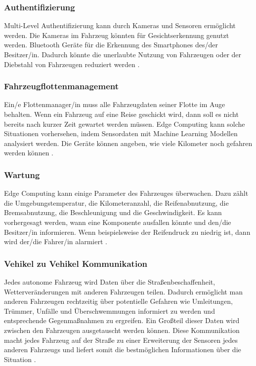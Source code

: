 \documentclass{sigchi}
\begin{document}

\subsubsection{Authentifizierung}
Multi-Level Authentifizierung kann durch Kameras und Sensoren ermöglicht werden. Die Kameras im Fahrzeug könnten für Gesichtserkennung genutzt werden. Bluetooth Geräte für die Erkennung des Smartphones des/der Besitzer/in. Dadurch könnte die unerlaubte Nutzung von Fahrzeugen oder der Diebstahl von Fahrzeugen reduziert werden \cite{role-edge-computing:2020}.

\subsubsection{Fahrzeugflottenmanagement}
Ein/e Flottenmanager/in muss alle Fahrzeugdaten seiner Flotte im Auge behalten. Wenn ein Fahrzeug auf eine Reise geschickt wird, dann soll es nicht bereits nach kurzer Zeit gewartet werden müssen. Edge Computing kann solche Situationen vorhersehen, indem Sensordaten mit Machine Learning Modellen analysiert werden. Die Geräte können angeben, wie viele Kilometer noch gefahren werden können \cite{role-edge-computing:2020}.

\subsubsection{Wartung}
Edge Computing kann einige Parameter des Fahrzeuges überwachen. Dazu zählt die Umgebungstemperatur, die Kilometeranzahl, die Reifenabnutzung, die Bremsabnutzung, die Beschleunigung und die Geschwindigkeit. Es kann vorhergesagt werden, wann eine Komponente ausfallen könnte und den/die Besitzer/in informieren. Wenn beispielsweise der Reifendruck zu niedrig ist, dann wird der/die Fahrer/in alarmiert \cite{role-edge-computing:2020}.

\subsubsection{Vehikel zu Vehikel Kommunikation}
Jedes autonome Fahrzeug wird Daten über die Straßenbeschaffenheit, Wetterveränderungen mit anderen Fahrzeugen teilen. Dadurch ermöglicht man anderen Fahrzeugen rechtzeitig über potentielle Gefahren wie Umleitungen, Trümmer, Unfälle und Überschwemmungen informiert zu werden und entsprechende Gegenmaßnahmen zu ergreifen. Ein Großteil dieser Daten wird zwischen den Fahrzeugen ausgetauscht werden können. Diese Kommunikation macht jedes Fahrzeug auf der Straße zu einer Erweiterung der Sensoren jedes anderen Fahrzeugs und liefert somit die bestmöglichen Informationen über die Situation \cite{5-use-cases:2019}.
\end{document}
